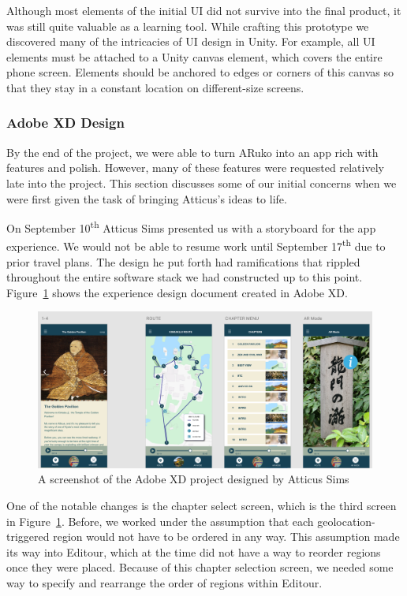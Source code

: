 \documentclass[a4paper, 10pt, american, titlepage]{article}
\begin{document}
Although most elements of the initial UI did not survive into the final product,
it was still quite valuable as a learning tool. While crafting this prototype we
discovered many of the intricacies of UI design in Unity. For example, all UI
elements must be attached to a Unity canvas element, which covers the entire
phone screen. Elements should be anchored to edges or corners of this canvas so
that they stay in a constant location on different-size screens.

\subsubsection{Adobe XD Design}
\label{sec:adobeXdDesign}

By the end of the project, we were able to turn ARuko into an app rich with
features and polish. However, many of these features were requested relatively
late into the project. This section discusses some of our initial concerns when
we were first given the task of bringing Atticus's ideas to life.

On September 10\textsuperscript{th} Atticus Sims presented us with a storyboard
for the app experience. We would not be able to resume work until September
17\textsuperscript{th} due to prior travel plans. The design he put forth had
ramifications that rippled throughout the entire software stack we had
constructed up to this point. Figure~\ref{fig:adobeXdDesign} shows the
experience design document created in Adobe XD.

\begin{figure}[h]
	\centering
	\includegraphics[width=1\textwidth]{adobe-xd-design.png}
	\caption[A screenshot of the Adobe XD project designed by Atticus Sims]
    {A screenshot of the Adobe XD project designed by Atticus Sims}
	\label{fig:adobeXdDesign}
\end{figure}

One of the notable changes is the chapter select screen, which is the third
screen in Figure~\ref{fig:adobeXdDesign}. Before, we worked under the assumption
that each geolocation-triggered region would not have to be ordered in any way.
This assumption made its way into Editour, which at the time did not have a way
to reorder regions once they were placed. Because of this chapter selection
screen, we needed some way to specify and rearrange the order of regions within
Editour.
\end{document}
